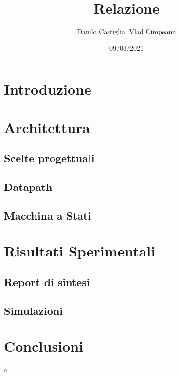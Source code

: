 \documentclass{article}
\title{Relazione}
\date{09/03/2021}
\author{Danilo Castiglia, Vlad Cimpeanu}
\begin{document}
\maketitle
{}
\newpage
{}

\section{Introduzione}
\section{Architettura}
\subsection{Scelte progettuali}
\subsection{Datapath}

\subsection{Macchina a Stati}

\section{Risultati Sperimentali}
\subsection{Report di sintesi}
\subsection{Simulazioni}
\section{Conclusioni}

a


\end{document}
